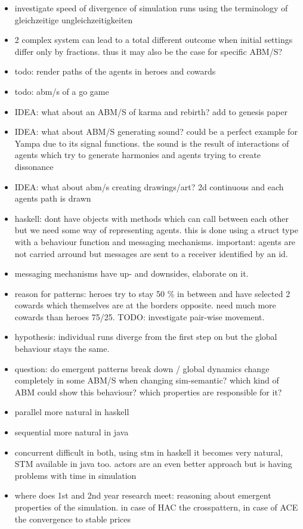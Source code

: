 \begin{itemize}
\item investigate speed of divergence of simulation runs using the terminology of gleichzeitige ungleichzeitigkeiten
\item 2 complex system can lead to a total different outcome when initial settings differ only by fractions. thus it may also be the case for specific ABM/S?
\item todo: render paths of the agents in heroes and cowards
\item todo: abm/s of a go game
\item IDEA: what about an ABM/S of karma and rebirth? add to genesis paper
\item IDEA: what about ABM/S generating sound? could be a perfect example for Yampa due to its signal functions. the sound is the result of interactions of agents which try to generate harmonies and agents trying to create dissonance
\item IDEA: what about abm/s creating drawings/art? 2d continuous and each agents path is drawn
\item haskell: dont have objects with methods which can call between each other but we need some way of representing agents. this is done using a struct type with a behaviour function and messaging mechanisms. important: agents are not carried arround but messages are sent to a receiver identified by an id. 
\item messaging mechanisms have up- and downsides, elaborate on it.
\item reason for patterns: heroes try to stay 50 \% in between and have selected 2 cowards which themselves are at the borders opposite. need much more cowards than heroes 75/25. TODO: investigate pair-wise movement.
\item hypothesis: individual runs diverge from the first step on but the global behaviour stays the same.
\item question: do emergent patterns break down / global dynamics change completely in some ABM/S when changing sim-semantic? which kind of ABM could show this behaviour? which properties are responsible for it?
\item parallel more natural in haskell
\item sequential more natural in java
\item concurrent difficult in both, using stm in haskell it becomes very natural, STM available in java too. actors are an even better approach but is having problems with time in simulation
\item where does 1st and 2nd year research meet: reasoning about emergent properties of the simulation. in case of HAC the crosspattern, in case of ACE the convergence to stable prices


\end{itemize}

